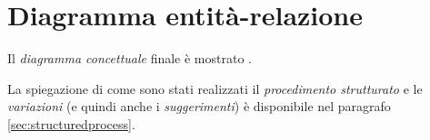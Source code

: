 \section{Diagramma entità-relazione}\label{sec:conceptdiagram}
Il {\it diagramma concettuale} finale è mostrato .


La spiegazione di come sono stati realizzati il {\it procedimento strutturato} e le {\it variazioni}
(e quindi anche i {\it suggerimenti}) è disponibile nel paragrafo \vref{sec:structuredprocess}.
\clearpage
{}
\thispagestyle{plain}

\restoregeometry
